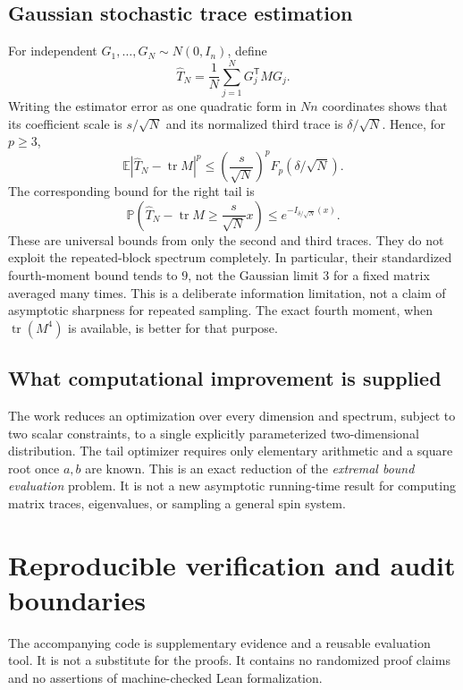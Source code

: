 \documentclass[11pt]{article}
\numberwithin{equation}{section}
\theoremstyle{definition}
\theoremstyle{remark}
\newcommand{\E}{\mathbb E}
\newcommand{\Prob}{\mathbb P}
\newcommand{\tr}{\operatorname{tr}}
\begin{document}
\subsection{Gaussian stochastic trace estimation}
For independent $G_1,\ldots,G_N\sim N(0,I_n)$, define
\[
\widehat T_N=\frac1N\sum_{j=1}^NG_j^{\mathsf T}MG_j.
\]
Writing the estimator error as one quadratic form in $Nn$ coordinates shows that its coefficient scale is $s/\sqrt N$ and its normalized third trace is $\delta/\sqrt N$. Hence, for $p\geq3$,
\begin{equation}\label{eq:trace-estimator}
\E|\widehat T_N-\tr M|^p
\leq\left(\frac{s}{\sqrt N}\right)^pF_p(\delta/\sqrt N).
\end{equation}
The corresponding bound for the right tail is
\[
\Prob\!\left(\widehat T_N-\tr M\geq\frac{s}{\sqrt N}x\right)
\leq e^{-I_{\delta/\sqrt N}(x)}.
\]
These are universal bounds from only the second and third traces. They do not exploit the repeated-block spectrum completely. In particular, their standardized fourth-moment bound tends to $9$, not the Gaussian limit $3$ for a fixed matrix averaged many times. This is a deliberate information limitation, not a claim of asymptotic sharpness for repeated sampling. The exact fourth moment, when $\tr(M^4)$ is available, is better for that purpose.

\subsection{What computational improvement is supplied}
The work reduces an optimization over every dimension and spectrum, subject to two scalar constraints, to a single explicitly parameterized two-dimensional distribution. The tail optimizer requires only elementary arithmetic and a square root once $a,b$ are known. This is an exact reduction of the \emph{extremal bound evaluation} problem. It is not a new asymptotic running-time result for computing matrix traces, eigenvalues, or sampling a general spin system.

\section{Reproducible verification and audit boundaries}
\label{sec:verification}

The accompanying code is supplementary evidence and a reusable evaluation tool. It is not a substitute for the proofs. It contains no randomized proof claims and no assertions of machine-checked Lean formalization.
\end{document}
